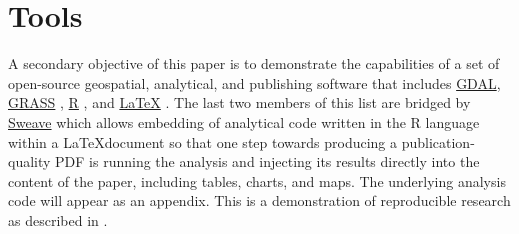 \section{Tools}
\label{sec:tools}

A secondary objective of this paper is to demonstrate the capabilities
of a set of open-source geospatial, analytical, and publishing
software that includes \href{http://www.gdal.org/}{GDAL},
\href{http://grass.osgeo.org/}{GRASS} \citep{GRASS},
\href{http://www.r-project.org/}{R} \citep{R} , and
\href{http://www.latex-project.org/}{\LaTeX} \citep{Lamport1994} .
The last two members of this list are bridged by
\href{http://www.stat.uni-muenchen.de/~leisch/Sweave/}{Sweave}
\citep{Leisch2002} which allows embedding of analytical code written
in the R language within a \LaTeX document so that one step towards
producing a publication-quality PDF is running the analysis and
injecting its results directly into the content of the paper,
including tables, charts, and maps.  The underlying analysis code will
appear as an appendix.  This is a demonstration of reproducible
research as described in \citet{Gentleman2007}.



